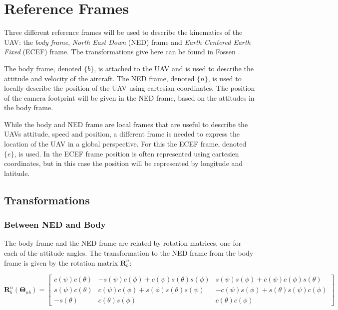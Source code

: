 \section{Reference Frames}

Three different reference frames will be used to describe the kinematics of the UAV: the \textit{body frame}, \textit{North East Down} (NED) frame and \textit{Earth Centered Earth Fixed} (ECEF) frame. The transformations give here can be found in Fossen \cite{FOSSEN}.

The body frame, denoted $\{b\}$, is attached to the UAV and is used to describe the attitude and velocity of the aircraft. The NED frame, denoted $\{n\}$, is used to locally describe the position of the UAV using cartesian coordinates. The position of the camera footprint will be given in the NED frame, based on the attitudes in the body frame.

While the body and NED frame are local frames that are useful to describe the UAVs attitude, speed and position, a different frame is needed to express the location of the UAV in a global perspective. For this the ECEF frame, denoted $\{e\}$, is used. In the ECEF frame position is often represented using cartesien coordinates, but in this case the position will be represented by longitude and latitude.


\subsection{Transformations}


\subsubsection{Between NED and Body}

The body frame and the NED frame are related by rotation matrices, one for each of the attitude angles. The transformation to the NED frame from the body frame is given by the rotation matrix $\mathbf{R}_b^n$:

\begin{equation}
	\mathbf{R}_b^n(\bm{\Theta}_{nb}) =
	\begin{bmatrix}
		c(\psi)c(\theta) & -s(\psi)c(\phi)+c(\psi)s(\theta)s(\phi) & s(\psi)s(\phi)+c(\psi)c(\phi)s(\theta) \\
		s(\psi)c(\theta) & c(\psi)c(\phi)+s(\phi)s(\theta)s(\psi) & -c(\psi)s(\phi)+s(\theta)s(\psi)c(\phi) \\
		-s(\theta) & c(\theta)s(\phi) & c(\theta)c(\phi)
	\end{bmatrix}
\end{equation}

